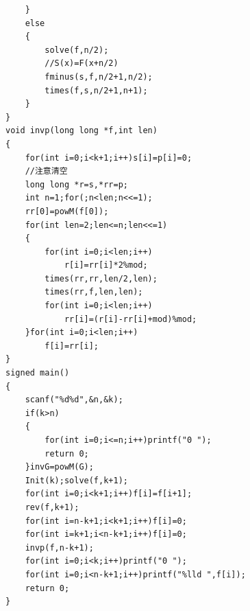 \begin{verbatim}
    }
    else
    {
        solve(f,n/2);
        //S(x)=F(x+n/2)
        fminus(s,f,n/2+1,n/2);
        times(f,s,n/2+1,n+1);
    }
}
void invp(long long *f,int len)
{
    for(int i=0;i<k+1;i++)s[i]=p[i]=0;
    //注意清空
    long long *r=s,*rr=p;
    int n=1;for(;n<len;n<<=1);
    rr[0]=powM(f[0]);
    for(int len=2;len<=n;len<<=1)
    {
        for(int i=0;i<len;i++)
            r[i]=rr[i]*2%mod;
        times(rr,rr,len/2,len);
        times(rr,f,len,len);
        for(int i=0;i<len;i++)
            rr[i]=(r[i]-rr[i]+mod)%mod;
    }for(int i=0;i<len;i++)
        f[i]=rr[i];
}
signed main()
{
    scanf("%d%d",&n,&k);
    if(k>n)
    {
        for(int i=0;i<=n;i++)printf("0 ");
        return 0;
    }invG=powM(G);
    Init(k);solve(f,k+1);
    for(int i=0;i<k+1;i++)f[i]=f[i+1];
    rev(f,k+1);
    for(int i=n-k+1;i<k+1;i++)f[i]=0;
    for(int i=k+1;i<n-k+1;i++)f[i]=0;
    invp(f,n-k+1);
    for(int i=0;i<k;i++)printf("0 ");
    for(int i=0;i<n-k+1;i++)printf("%lld ",f[i]);
    return 0;
}
\end{verbatim}